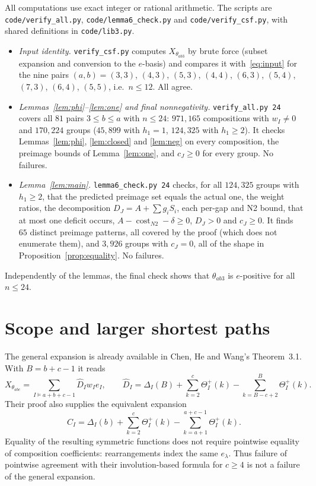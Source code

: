 \documentclass[11pt]{article}
\theoremstyle{remark}
\theoremstyle{definition}
\DeclareMathOperator{\cost}{cost}
\newcommand{\Tp}{\Theta^{+}}
\begin{document}
All computations use exact integer or rational arithmetic. The scripts are \texttt{code/verify\_all.py}, \texttt{code/lemma6\_check.py} and \texttt{code/verify\_csf.py}, with shared definitions in \texttt{code/lib3.py}.
\begin{itemize}
\item \emph{Input identity.} \texttt{verify\_csf.py} computes $X_{\theta_{ab3}}$ by brute force (subset expansion and conversion to the $e$-basis) and compares it with~\eqref{eq:input} for the nine pairs $(a,b)=(3,3)$, $(4,3)$, $(5,3)$, $(4,4)$, $(6,3)$, $(5,4)$, $(7,3)$, $(6,4)$, $(5,5)$, i.e.\ $n\le12$. All agree.
\item \emph{Lemmas~\ref{lem:phi}--\ref{lem:one} and final nonnegativity.} \texttt{verify\_all.py 24} covers all $81$ pairs $3\le b\le a$ with $n\le24$: $971{,}165$ compositions with $w_I\ne0$ and $170{,}224$ groups ($45{,}899$ with $h_1=1$, $124{,}325$ with $h_1\ge2$). It checks Lemmas~\ref{lem:phi}, \ref{lem:closed} and \ref{lem:neg} on every composition, the preimage bounds of Lemma~\ref{lem:one}, and $c_J\ge0$ for every group. No failures.
\item \emph{Lemma~\ref{lem:main}.} \texttt{lemma6\_check.py 24} checks, for all $124{,}325$ groups with $h_1\ge2$, that the predicted preimage set equals the actual one, the weight ratios, the decomposition $D_J=A+\sum g_iS_i$, each per-gap and N2 bound, that at most one deficit occurs, $A-\cost_{N2}-\delta\ge0$, $D_J>0$ and $c_J\ge0$. It finds $65$ distinct preimage patterns, all covered by the proof (which does not enumerate them), and $3{,}926$ groups with $c_J=0$, all of the shape in Proposition~\ref{prop:equality}. No failures.
\end{itemize}
Independently of the lemmas, the final check shows that $\theta_{ab3}$ is $e$-positive for all $n\le24$.

\section{Scope and larger shortest paths}\label{sec:general}

The general expansion is already available in Chen, He and Wang's Theorem~3.1. With $B=b+c-1$ it reads
\[
X_{\theta_{abc}}=\sum_{I\models a+b+c-1}\widehat D_Iw_Ie_I,\qquad
\widehat D_I=\Delta_I(B)+\sum_{k=2}^{c}\Tp_I(k)
-\sum_{k=B-c+2}^{B}\Tp_I(k).
\]
Their proof also supplies the equivalent expansion
\[
C_I=\Delta_I(b)+\sum_{k=2}^{c}\Tp_I(k)
-\sum_{k=a+1}^{a+c-1}\Tp_I(k).
\]
Equality of the resulting symmetric functions does not require pointwise equality of composition coefficients: rearrangements index the same $e_\lambda$. Thus failure of pointwise agreement with their involution-based formula for $c\ge4$ is not a failure of the general expansion.
\end{document}

